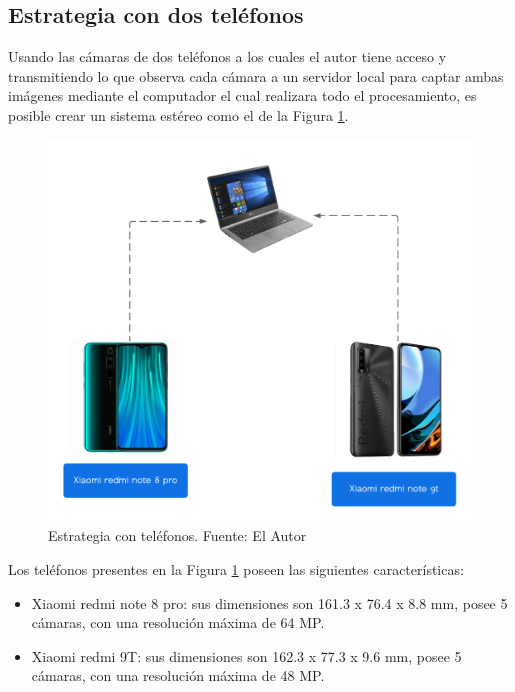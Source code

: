 \subsection{Estrategia con dos teléfonos}
Usando las cámaras de dos teléfonos a los cuales el autor tiene acceso y transmitiendo lo que observa cada cámara a un servidor local para captar ambas imágenes mediante el computador el cual realizara todo el procesamiento, es posible crear un sistema estéreo como el de la Figura \ref{estrategia_phone}.
\begin{figure}[H]
    \centering
    \includegraphics[scale=0.5]{Recursos/estrategia_telefonos.png}
    \caption[Estrategia con teléfonos.]{Estrategia con teléfonos. {\footnotesize Fuente: El Autor}}
    \label{estrategia_phone}
\end{figure}
Los teléfonos presentes en la Figura \ref{estrategia_phone} poseen las siguientes características:
\begin{itemize}
    \item Xiaomi redmi note 8 pro: sus dimensiones son 161.3 x 76.4 x 8.8 mm, posee 5 cámaras, con una resolución máxima de 64 MP.
    \item Xiaomi redmi 9T: sus dimensiones son 162.3 x 77.3 x 9.6 mm, posee 5 cámaras, con una resolución máxima de 48 MP.
\end{itemize}
